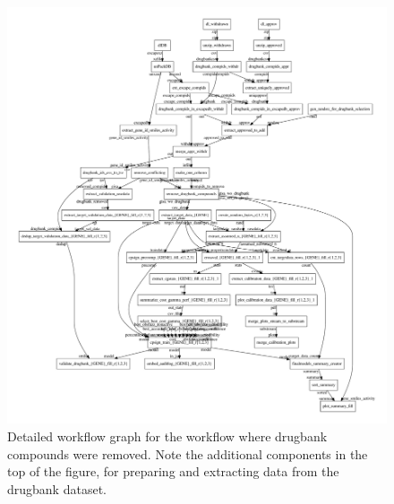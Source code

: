 \documentclass[utf8]{frontiersSCNS} %
\begin{document}
\begin{figure}[h!]
\includegraphics[width=\textwidth]{figures/workflow_graph_wo_drugbank.pdf}
    \caption{Detailed workflow graph for the workflow where drugbank compounds
    were removed. Note the additional components in the top of the figure, for
    preparing and extracting data from the drugbank dataset.}
    \label{fig:workflow_detailed_wo_drugbank}
\end{figure}
\end{document}
